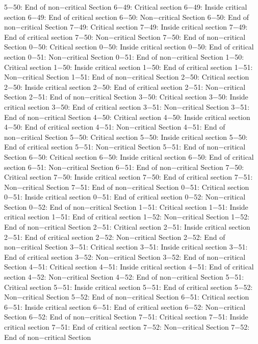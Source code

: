 5−50: End of non−critical Section
6−49: Critical section
6−49: Inside critical section
6−49: End of critical section
6−50: Non−critical Section
6−50: End of non−critical Section
7−49: Critical section
7−49: Inside critical section
7−49: End of critical section
7−50: Non−critical Section
7−50: End of non−critical Section
0−50: Critical section
0−50: Inside critical section
0−50: End of critical section
0−51: Non−critical Section
0−51: End of non−critical Section
1−50: Critical section
1−50: Inside critical section
1−50: End of critical section
1−51: Non−critical Section
1−51: End of non−critical Section
2−50: Critical section
2−50: Inside critical section
2−50: End of critical section
2−51: Non−critical Section
2−51: End of non−critical Section
3−50: Critical section
3−50: Inside critical section
3−50: End of critical section
3−51: Non−critical Section
3−51: End of non−critical Section
4−50: Critical section
4−50: Inside critical section
4−50: End of critical section
4−51: Non−critical Section
4−51: End of non−critical Section
5−50: Critical section
5−50: Inside critical section
5−50: End of critical section
5−51: Non−critical Section
5−51: End of non−critical Section
6−50: Critical section
6−50: Inside critical section
6−50: End of critical section
6−51: Non−critical Section
6−51: End of non−critical Section
7−50: Critical section
7−50: Inside critical section
7−50: End of critical section
7−51: Non−critical Section
7−51: End of non−critical Section
0−51: Critical section
0−51: Inside critical section
0−51: End of critical section
0−52: Non−critical Section
0−52: End of non−critical Section
1−51: Critical section
1−51: Inside critical section
1−51: End of critical section
1−52: Non−critical Section
1−52: End of non−critical Section
2−51: Critical section
2−51: Inside critical section
2−51: End of critical section
2−52: Non−critical Section
2−52: End of non−critical Section
3−51: Critical section
3−51: Inside critical section
3−51: End of critical section
3−52: Non−critical Section
3−52: End of non−critical Section
4−51: Critical section
4−51: Inside critical section
4−51: End of critical section
4−52: Non−critical Section
4−52: End of non−critical Section
5−51: Critical section
5−51: Inside critical section
5−51: End of critical section
5−52: Non−critical Section
5−52: End of non−critical Section
6−51: Critical section
6−51: Inside critical section
6−51: End of critical section
6−52: Non−critical Section
6−52: End of non−critical Section
7−51: Critical section
7−51: Inside critical section
7−51: End of critical section
7−52: Non−critical Section
7−52: End of non−critical Section
